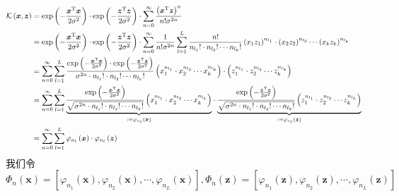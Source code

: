\documentclass{article}
\begin{document}
\begin{homeworkProblem}
	\begin{align}
		\mathcal{K} \left( \boldsymbol{x},\boldsymbol{z} \right) &=\text{exp} \left( -\frac{\boldsymbol{x}^{\text{T}}\boldsymbol{x}}{2\sigma ^2} \right) \cdot \text{exp} \left( -\frac{\boldsymbol{z}^{\text{T}}\boldsymbol{z}}{2\sigma ^2} \right) \cdot \sum_{n=0}^{\infty}{\frac{\left( \boldsymbol{x}^{\text{T}}\boldsymbol{z} \right) ^n}{n!\sigma ^{2n}}} \notag
		\\
		&=\text{exp} \left( -\frac{\boldsymbol{x}^{\text{T}}\boldsymbol{x}}{2\sigma ^2} \right) \cdot \text{exp} \left( -\frac{\boldsymbol{z}^{\text{T}}\boldsymbol{z}}{2\sigma ^2} \right) \cdot \sum_{n=0}^{\infty}{\frac{1}{n!\sigma ^{2n}}\sum_{l=1}^L{\frac{n!}{n_{l_1}!\cdot n_{l_2}!\cdots n_{l_k}!}\left( x_1z_1 \right) ^{n_{l_1}}\cdot \left( x_2z_2 \right) ^{n_{l_2}}\cdots \left( x_kz_k \right) ^{n_{l_k}}}} \notag
		\\
		&=\sum_{n=0}^{\infty}{\sum_{l=1}^L{\frac{\text{exp} \left( -\frac{\boldsymbol{x}^{\text{T}}\boldsymbol{x}}{2\sigma ^2} \right) \cdot \text{exp} \left( -\frac{\boldsymbol{z}^{\text{T}}\boldsymbol{z}}{2\sigma ^2} \right)}{\sigma ^{2n}\cdot n_{l_1}!\cdot n_{l_2}!\cdots n_{l_k}!}\left( x_{1}^{n_{l_1}}\cdot x_{2}^{n_{l_2}}\cdots x_{k}^{n_{l_k}} \right) \cdot \left( z_{1}^{n_{l_1}}\cdot z_{2}^{n_{l_2}}\cdots z_{k}^{n_{l_k}} \right)}} \notag
		\\
		&=\sum_{n=0}^{\infty}{\sum_{l=1}^L{\underset{:=\varphi _{n_l}\left( \boldsymbol{x} \right)}{\underbrace{\frac{\text{exp} \left( -\frac{\boldsymbol{x}^{\text{T}}\boldsymbol{x}}{2\sigma ^2} \right)}{\sqrt{\sigma ^{2n}\cdot n_{l_1}!\cdot n_{l_2}!\cdots n_{l_k}!}}\left( x_{1}^{n_{l_1}}\cdot x_{2}^{n_{l_2}}\cdots x_{k}^{n_{l_k}} \right) }}\cdot \underset{:=\varphi _{n_l}\left( \boldsymbol{z} \right)}{\underbrace{\frac{\text{exp} \left( -\frac{\boldsymbol{z}^{\text{T}}\boldsymbol{z}}{2\sigma ^2} \right)}{\sqrt{\sigma ^{2n}\cdot n_{l_1}!\cdot n_{l_2}!\cdots n_{l_k}!}}\left( z_{1}^{n_{l_1}}\cdot z_{2}^{n_{l_2}}\cdots z_{k}^{n_{l_k}} \right) }}}} \notag
		\\
		&=\sum_{n=0}^{\infty}{\sum_{l=1}^L{\varphi _{n_l}\left( \boldsymbol{x} \right) \cdot \varphi _{n_l}\left( \boldsymbol{z} \right)}} \notag
	\end{align}
	我们令$$\varPhi _n\left( \boldsymbol{x} \right) =\left[ \varphi _{n_1}\left( \boldsymbol{x} \right) ,\varphi _{n_2}\left( \boldsymbol{x} \right) ,\cdots ,\varphi _{n_L}\left( \boldsymbol{x} \right) \right] ,\varPhi _n\left( \boldsymbol{z} \right) =\left[ \varphi _{n_1}\left( \boldsymbol{z} \right) ,\varphi _{n_2}\left( \boldsymbol{z} \right) ,\cdots ,\varphi _{n_L}\left( \boldsymbol{z} \right) \right] 
$$
\end{homeworkProblem}
\end{document}
